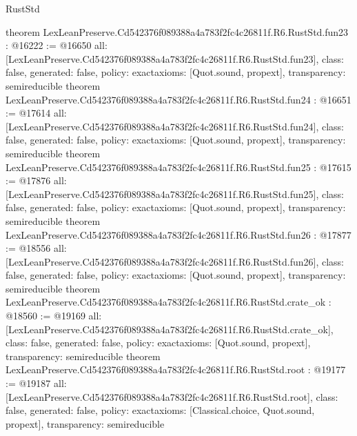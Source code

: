 \begin{lexlean}{RustStd}
\begin{coremodule}
{}
theorem LexLeanPreserve.Cd542376f089388a4a783f2fc4c26811f.R6.RustStd.fun23 : @16222 := @16650 {
  all: [LexLeanPreserve.Cd542376f089388a4a783f2fc4c26811f.R6.RustStd.fun23],
  class: false,
  generated: false,
  policy: exact{axioms: [Quot.sound, propext]},
  transparency: semireducible
}
theorem LexLeanPreserve.Cd542376f089388a4a783f2fc4c26811f.R6.RustStd.fun24 : @16651 := @17614 {
  all: [LexLeanPreserve.Cd542376f089388a4a783f2fc4c26811f.R6.RustStd.fun24],
  class: false,
  generated: false,
  policy: exact{axioms: [Quot.sound, propext]},
  transparency: semireducible
}
theorem LexLeanPreserve.Cd542376f089388a4a783f2fc4c26811f.R6.RustStd.fun25 : @17615 := @17876 {
  all: [LexLeanPreserve.Cd542376f089388a4a783f2fc4c26811f.R6.RustStd.fun25],
  class: false,
  generated: false,
  policy: exact{axioms: [Quot.sound, propext]},
  transparency: semireducible
}
theorem LexLeanPreserve.Cd542376f089388a4a783f2fc4c26811f.R6.RustStd.fun26 : @17877 := @18556 {
  all: [LexLeanPreserve.Cd542376f089388a4a783f2fc4c26811f.R6.RustStd.fun26],
  class: false,
  generated: false,
  policy: exact{axioms: [Quot.sound, propext]},
  transparency: semireducible
}
theorem LexLeanPreserve.Cd542376f089388a4a783f2fc4c26811f.R6.RustStd.crate_ok : @18560 := @19169 {
  all: [LexLeanPreserve.Cd542376f089388a4a783f2fc4c26811f.R6.RustStd.crate_ok],
  class: false,
  generated: false,
  policy: exact{axioms: [Quot.sound, propext]},
  transparency: semireducible
}
theorem LexLeanPreserve.Cd542376f089388a4a783f2fc4c26811f.R6.RustStd.root : @19177 := @19187 {
  all: [LexLeanPreserve.Cd542376f089388a4a783f2fc4c26811f.R6.RustStd.root],
  class: false,
  generated: false,
  policy: exact{axioms: [Classical.choice, Quot.sound, propext]},
  transparency: semireducible
}


\end{coremodule}
\end{lexlean}
